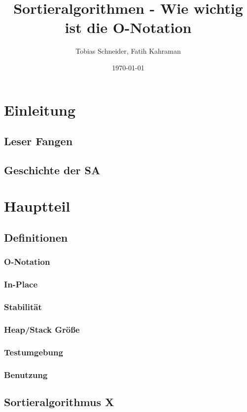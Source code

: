 \documentclass{article}
\title{Sortieralgorithmen - Wie wichtig ist die O-Notation}
\author{Tobias Schneider, Fatih Kahraman}
\date{\today}
\begin{document}
\maketitle %

\newpage{}
\tableofcontents{}%
\newpage{}


\section{Einleitung}
\subsection{Leser Fangen}
\subsection{Geschichte der SA}

\section{Hauptteil}
\subsection{Definitionen}
\subsubsection{O-Notation}
\subsubsection{In-Place}
\subsubsection{Stabilität}
\subsubsection{Heap/Stack Größe}
\subsubsection{Testumgebung}
\subsubsection{Benutzung}

\subsection{Sortieralgorithmus X}
\end{document}
